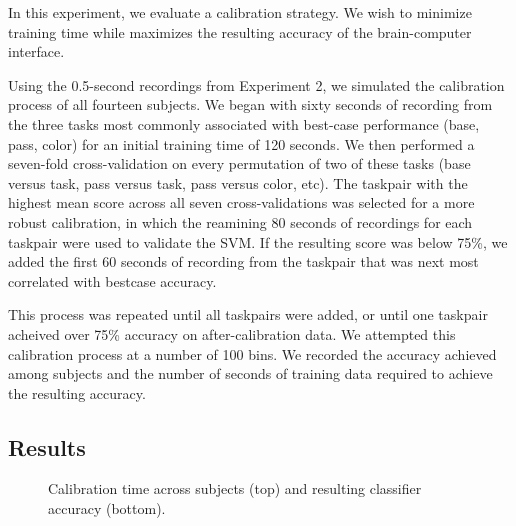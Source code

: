 In this experiment, we evaluate a calibration strategy. We wish to minimize training time while maximizes the resulting accuracy of the brain-computer interface.

Using the 0.5-second recordings from Experiment 2, we simulated the calibration process of all fourteen subjects. We began with sixty seconds of recording from the three tasks most commonly associated with best-case performance (base, pass, color) for an initial training time of 120 seconds. We then performed a seven-fold cross-validation on every permutation of two of these tasks (base versus task, pass versus task, pass versus color, etc). The taskpair with the highest mean score across all seven cross-validations was selected for a more robust calibration, in which the reamining 80 seconds of recordings for each taskpair were used to validate the SVM. If the resulting score was below 75\%, we added the first 60 seconds of recording from the taskpair that was next most correlated with bestcase accuracy. 

This process was repeated until all taskpairs were added, or until one taskpair acheived over 75\% accuracy on after-calibration data. We attempted this calibration process at a number of 100 bins. We recorded the accuracy achieved among subjects and the number of seconds of training data required to achieve the resulting accuracy.

\subsection{Results}

\begin{figure}[!h]
  \vspace{-0.2cm}
  \centering
   {}
  \caption{Calibration time across subjects (top) and resulting classifier accuracy (bottom).}
  \label{fig:fig2}
  \vspace{-0.1cm}
\end{figure}





